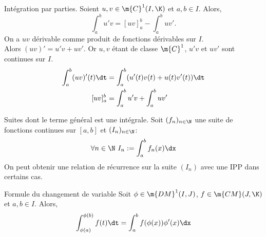 \documentclass[11pt]{article}
\begin{document}
\begin{thm}{Intégration par parties.}{}
    Soient $u,v\in\m{C}^1(I,\K)$ et $a,b\in I$. Alors,
    \begin{equation*}
        \int_a^bu'v=[uv]_a^b-\int_a^buv'.
    \end{equation*}
    \tcblower
    On a $uv$ dérivable comme produit de fonctions dérivables sur $I$.\\
    Alors $(uv)'=u'v + uv'$. Or $u,v$ étant de classe $\m{C}^1$, $u'v$ et $uv'$ sont continues sur $I$.
    \begin{align*}
        \int_a^b(uv)'(t)\dt&=\int_a^b(u'(t)v(t)+u(t)v'(t))\dt\\
        [uv]_a^b &= \int_a^bu'v+\int_a^buv'
    \end{align*}
\end{thm}

\begin{ex}{Suites dont le terme général est une intégrale.}{}
    Soit $(f_n)_{n\in\N}$ une suite de fonctions continues sur $[a,b]$ et $(I_n)_{n\in\N}$:
    \begin{equation*}
        \forall n\in\N ~ I_n := \int_a^bf_n(x)\dx 
    \end{equation*}
    On peut obtenir une relation de récurrence sur la suite $(I_n)$ avec une IPP dans certains cas.
\end{ex}

\begin{thm}{Formule du changement de variable}{}
    Soit $\phi\in\m{DM}^1(I,J)$, $f\in\m{CM}(J,\K)$ et $a,b\in I$. Alors,
    \begin{equation*}
        \int_{\phi(a)}^{\phi(b)}f(t)\dt=\int_a^bf(\phi(x))\phi'(x)\dx
    \end{equation*}
\end{thm}
\end{document}
